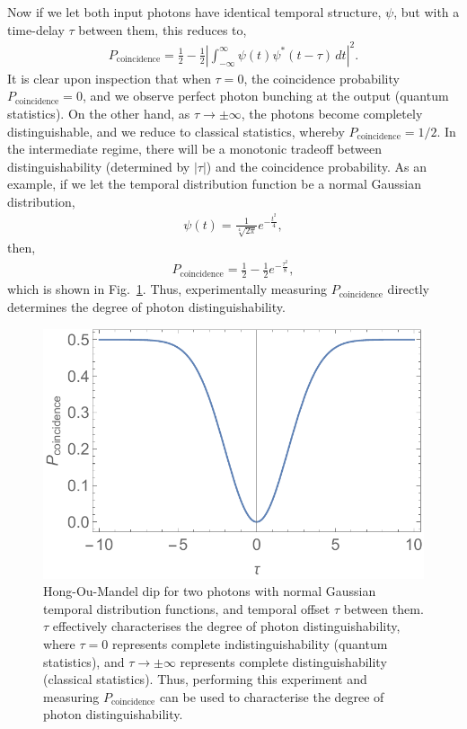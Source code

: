 \documentclass[aps, rmp, twocolumn, amsmath, amssymb, nofootinbib, superscriptaddress, longbibliography, floatfix, table-of-contents, eqsecnum]{revtex4-1}
\begin{document}
Now if we let both input photons have identical temporal structure, $\psi$, but with a time-delay $\tau$ between them, this reduces to,
\begin{align}
P_\text{coincidence} = \frac{1}{2} - \frac{1}{2} \left| \int^\infty_{-\infty} \psi(t)\psi^*(t-\tau)\,dt\right|^2.
\end{align}
It is clear upon inspection that when \mbox{$\tau=0$}, the coincidence probability \mbox{$P_\text{coincidence}=0$}, and we observe perfect photon bunching at the output (quantum statistics). On the other hand, as \mbox{$\tau\to\pm\infty$}, the photons become completely distinguishable, and we reduce to classical statistics, whereby \mbox{$P_\text{coincidence}=1/2$}. In the intermediate regime, there will be a monotonic tradeoff between distinguishability (determined by $|\tau|$) and the coincidence probability. As an example, if we let the temporal distribution function be a normal Gaussian distribution,
\begin{align}
\psi(t) = \frac{1}{\sqrt[4]{2\pi}}e^{-\frac{t^2}{4}},
\end{align}
then,
\begin{align}
P_\text{coincidence} = \frac{1}{2} - \frac{1}{2} e^{-\frac{\tau^2}{8}},
\end{align}
which is shown in Fig.~\ref{fig:HOM_dip}. Thus, experimentally measuring $P_\text{coincidence}$ directly determines the degree of photon distinguishability.

\begin{figure}[!htb]
\includegraphics[width=\columnwidth]{HOM_dip}
\caption{Hong-Ou-Mandel dip for two photons with normal Gaussian temporal distribution functions, and temporal offset $\tau$ between them. $\tau$ effectively characterises the degree of photon distinguishability, where \mbox{$\tau=0$} represents complete indistinguishability (quantum statistics), and \mbox{$\tau\to\pm\infty$} represents complete distinguishability (classical statistics). Thus, performing this experiment and measuring $P_\text{coincidence}$ can be used to characterise the degree of photon distinguishability.} \label{fig:HOM_dip}
\end{figure}
\end{document}
